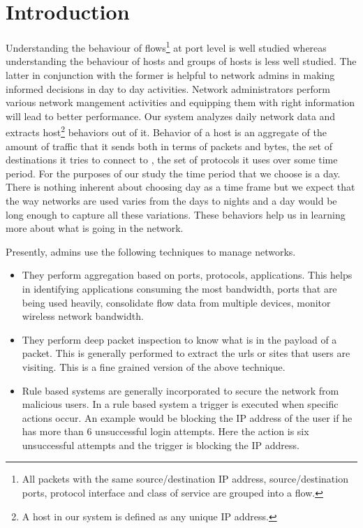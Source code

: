 
\chapter{Introduction}

Understanding the behaviour of flows\footnote{All packets with the same source/destination IP address, source/destination ports, protocol interface and class of service are grouped into a flow.} at port level is well studied whereas understanding the behaviour of hosts and groups of hosts is less well studied. The latter in conjunction with the former is helpful to network admins in making informed decisions in day to day activities. Network administrators perform various network mangement activities and equipping them with right information will lead to better performance. 
Our system analyzes daily network data and extracts host\footnote{A host in our system is defined as any unique IP address.} behaviors out of it.  Behavior of a host is an aggregate of the amount of traffic that it sends both in terms of packets and bytes, the set of destinations it tries to connect to , the set of protocols it uses over some time period. For the purposes of our study the time period that we choose is a day. There is nothing inherent about choosing day as a time frame but we expect that the way networks are used varies from the days to nights and a day would be long enough to capture all these variations. These behaviors help us in learning more about what is going in the network. 

Presently, admins use the following techniques to manage networks. 
\begin{itemize}
	\item They perform aggregation based on ports, protocols, applications. This helps in identifying applications consuming the most bandwidth, ports that are being used heavily, consolidate flow data from multiple devices, monitor wireless network bandwidth.
	
	\item They perform deep packet inspection to know what is in the payload of a packet. This is generally performed to extract the urls or sites that users are  visiting. This is a fine grained version of the above technique.
	
	\item Rule based systems are generally incorporated to secure the network from malicious users. In a rule based system a trigger is executed when specific actions occur. An example would be blocking the IP address of the user if he has more than 6 unsuccessful login attempts. Here the action is six unsuccessful attempts and the trigger is blocking the IP address. 
\end{itemize}


